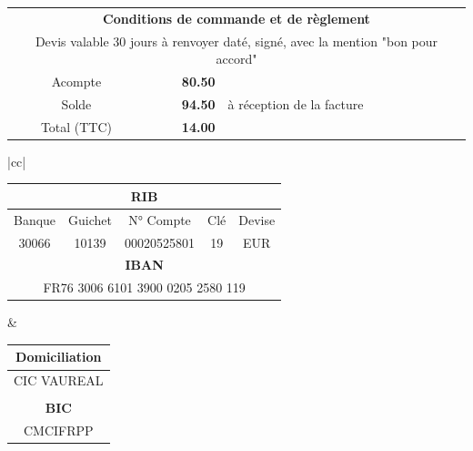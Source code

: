 \documentclass[11pt,french]{article}%
\def\Total{94.50}%
\def\totalLeft{14.00}%
\def\deposit{80.50}%
\begin{document}
\vfill
\vfill
\begin{center}
\begin{tabular}{|crl|}
	\hline
	\multicolumn{3}{|c|}{\textbf{Conditions de commande et de règlement}} \\
	\multicolumn{3}{|c|}{Devis valable 30 jours à renvoyer daté, signé, avec la mention "bon pour accord"} \\
	Acompte & \textbf{\deposit \EUR} & \\
	Solde &	\textbf{\Total \EUR} & à réception de la facture \\
	Total (TTC) & \textbf{\totalLeft \EUR} & \\
	\hline
\end{tabular}
\begin{tabular}{|cc|}
	\hline
	\begin{minipage}{10cm}
	\begin{center}
		\begin{tabular}{ccccc}
		 	\multicolumn{5}{c}{\textbf{RIB}} \\
		 	\hline
			Banque & Guichet & N° Compte & Clé & Devise \\
			30066  & 10139 & 00020525801 & 19 & EUR \\ 
			\multicolumn{5}{c}{\textbf{IBAN}} \\
			\hline
			\multicolumn{5}{c}{FR76 3006 6101 3900 0205 2580 119}
		\end{tabular}
	\end{center}
	\end{minipage} &
	\begin{minipage}{7cm}
	\begin{center}
	\begin{tabular}{c}
		\textbf{Domiciliation} \\ \hline
		CIC VAUREAL \\
		\\
		\textbf{BIC} \\ \hline
		CMCIFRPP
	\end{tabular}
	\end{center}
	\end{minipage} \\ \hline \hline


\end{tabular}
\end{center}
\end{document}
